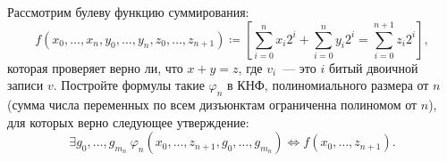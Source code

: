 Рассмотрим булеву функцию суммирования:
$$
    f(x_0, \dotsc, x_{n}, y_{0}, \dotsc, y_{n}, z_{0}, \dotsc, z_{n + 1}) \coloneqq
    [\sum\limits_{i = 0}^{n} x_i 2^{i} + \sum\limits_{i = 0}^{n} y_{i} 2^{i} =
    \sum\limits_{i = 0}^{n + 1} z_{i} 2^{i}],
$$
которая проверяет верно ли, что $x + y = z$, где $v_i$~--- это $i$ битый двоичной записи $v$. Постройте
формулы такие $\varphi_n$ в КНФ, полиномиального размера от $n$ (сумма числа переменных по всем дизъюнктам
ограниченна полиномом от $n$), для которых верно следующее утверждение:
$$
    \exists{g_0, \dotsc, g_{m_n}}~\varphi_n(x_{0}, \dotsc, z_{n + 1}, g_{0}, \dotsc, g_{m_n}) \iff
    f(x_{0}, \dotsc, z_{n + 1}).
$$